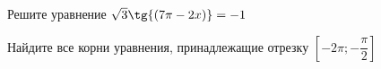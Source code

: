 \begin{ex}
	\begin{condition}
		\begin{enumcols}[label=\asbuk*)]
			\item Решите уравнение \( \sqrt{3}\tg{(7\pi - 2x)} = -1 \)
			\item Найдите все корни уравнения, принадлежащие отрезку \(  \left[-2\pi;-\dfrac{\pi}{2}\right] \)
		\end{enumcols}
	\end{condition}
\end{ex}